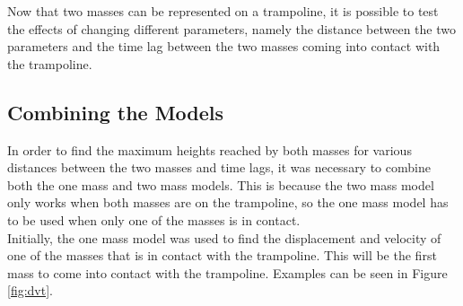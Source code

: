 \noindent Now that two masses can be represented on a trampoline, it is possible to test the effects of changing different parameters, namely the distance between the two parameters and the time lag between the two masses coming into contact with the trampoline.

\subsection{Combining the Models}\label{combine}
In order to find the maximum heights reached by both masses for various distances between the two masses and time lags, it was necessary to combine both the one mass and two mass models. This is because the two mass model only works when both masses are on the trampoline, so the one mass model has to be used when only one of the masses is in contact.\\

\noindent Initially, the one mass model was used to find the displacement and velocity of one of the masses that is in contact with the trampoline. This will be the first mass to come into contact with the trampoline. Examples can be seen in Figure \ref{fig:dvt}. 

